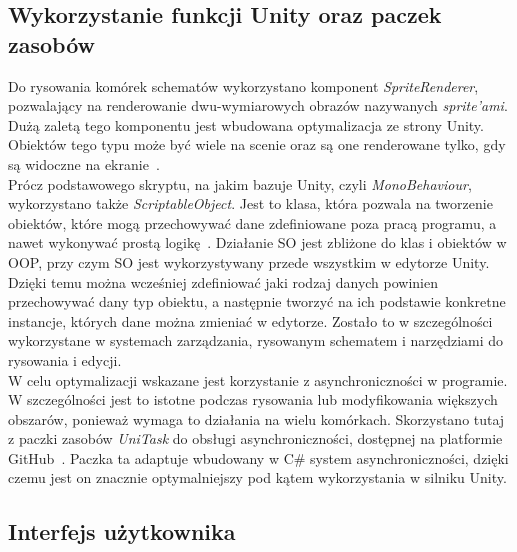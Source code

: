 \subsection{Wykorzystanie funkcji Unity oraz paczek zasobów}
\label{subsec:zasoby}

Do rysowania komórek schematów wykorzystano komponent \textit{SpriteRenderer},
pozwalający na renderowanie dwu-wymiarowych obrazów nazywanych \textit{sprite'ami}.
Dużą zaletą tego komponentu jest wbudowana optymalizacja ze strony Unity.
Obiektów tego typu może być wiele na scenie oraz są one renderowane tylko,
gdy są widoczne na ekranie~\cite{unity_csharp, unity_docs}. \\
\indent Prócz podstawowego skryptu, na jakim bazuje Unity, czyli \textit{MonoBehaviour},
wykorzystano także \textit{ScriptableObject}.
Jest to klasa, która pozwala na tworzenie obiektów, które mogą przechowywać dane zdefiniowane poza pracą programu,
a nawet wykonywać prostą logikę~\cite{unity_csharp, unity_docs}.
Działanie SO jest zbliżone do klas i obiektów w OOP,
przy czym SO jest wykorzystywany przede wszystkim w edytorze Unity.
Dzięki temu można wcześniej zdefiniować jaki rodzaj danych powinien przechowywać dany typ obiektu,
a następnie tworzyć na ich podstawie konkretne instancje, których dane można zmieniać w edytorze.
Zostało to w szczególności wykorzystane w systemach zarządzania, rysowanym schematem
i narzędziami do rysowania i edycji.\\
\indent W celu optymalizacji wskazane jest korzystanie z asynchroniczności w programie.
W szczególności jest to istotne podczas rysowania lub modyfikowania większych obszarów,
ponieważ wymaga to działania na wielu komórkach.
Skorzystano tutaj z paczki zasobów \textit{UniTask} do obsługi asynchroniczności,
dostępnej na platformie GitHub~\cite{unitask}.
Paczka ta adaptuje wbudowany w C\# system asynchroniczności,
dzięki czemu jest on znacznie optymalniejszy pod kątem wykorzystania w silniku Unity.


\subsection{Interfejs użytkownika}
\label{subsec:interfejs_uzytkownika}

